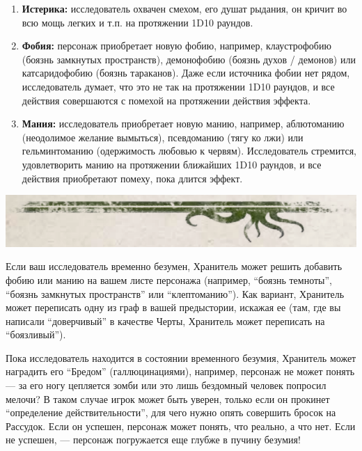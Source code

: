 \documentclass[letterpaper,twocolumn,openany, twoside, 11pt, usenames]{cocbook}
\begin{document}
\begin{fullcocpaperbox}{}{}
\begin{multicols}{2}
\begin{enumerate}
    \item \textbf{Истерика:} исследователь охвачен смехом, его душат рыдания, он кричит во всю мощь легких и т.п. на протяжении 1D10 раундов.
    \item \textbf{Фобия:} персонаж приобретает новую фобию, например, клаустрофобию (боязнь замкнутых пространств), демонофобию (боязнь духов / демонов) или катсаридофобию (боязнь тараканов). Даже если источника фобии нет рядом, исследователь думает, что это не так на протяжении 1D10 раундов, и все действия совершаются с помехой на протяжении действия эффекта.
    \item \textbf{Мания:} исследователь приобретает новую манию, например, аблютоманию (неодолимое желание вымыться), псевдоманию (тягу ко лжи) или гельминтоманию (одержимость любовью к червям). Исследователь стремится, удовлетворить манию на протяжении ближайших 1D10 раундов, и все действия приобретают помеху, пока длится эффект.
  \end{enumerate}
  \end{multicols}
  \includegraphics[width=\linewidth]{img/bottom.png}
  \end{fullcocpaperbox}{}{}
Если ваш исследователь временно безумен, Хранитель может решить добавить фобию или манию на вашем листе персонажа (например, ``боязнь темноты'', ``боязнь замкнутых пространств'' или ``клептоманию''). Как вариант, Хранитель может переписать одну из граф в вашей предыстории, искажая ее (там, где вы написали ``доверчивый'' в качестве Черты, Хранитель может переписать на ``боязливый'').

Пока исследователь находится в состоянии временного безумия, Хранитель может наградить его ``Бредом'' (галлюцинациями), например, персонаж не может понять --- за его ногу цепляется зомби или это лишь бездомный человек попросил мелочи? В таком случае игрок может быть уверен, только если он прокинет ``определение действительности'', для чего нужно опять совершить бросок на Рассудок. Если он успешен, персонаж может понять, что реально, а что нет. Если не успешен, --- персонаж погружается еще глубже в пучину безумия!
\end{document}
